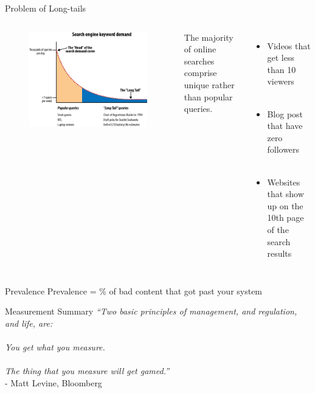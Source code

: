 \documentclass[nobackground,dvipsnames,table]{beamer}
\begin{document}
\begin{frame}{Problem of Long-tails}
    \begin{columns}
            \begin{figure}
                \centering
                \includegraphics[width=\textwidth]{long-tail}
            \end{figure}
            The majority of online searches comprise unique rather than popular queries. \\~\\
            \begin{itemize}
                \item Videos that get less than 10 viewers \\~\\
                \item Blog post that have zero followers \\~\\
                \item Websites that show up on the 10th page of the search results
            \end{itemize}
    \end{columns}
\end{frame}

\begin{frame}{Prevalence}
    Prevalence = \% of bad content that got past your system 
\end{frame}

\begin{frame}{Measurement Summary}
    \centering
    \textit{“Two basic principles of management, and regulation, and life, are:} \\~\\
    
    \textit{You get what you measure.} \\~\\
    
    \textit{The thing that you measure will get gamed.”} \\
          - Matt Levine, Bloomberg 
\end{frame}
\end{document}
